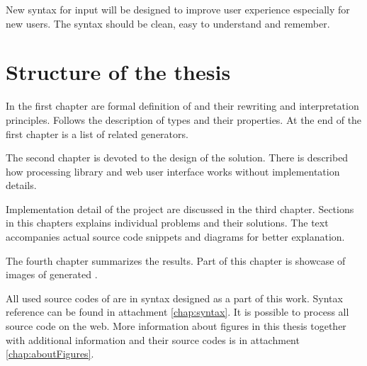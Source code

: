 New syntax for input will be designed to improve user experience especially for new users.
The syntax should be clean, easy to understand and remember.


\section*{Structure of the thesis}

In the first chapter are formal definition of \lsystems and their rewriting and interpretation principles.
Follows the description of \lsystem types and their properties.
At the end of the first chapter is a list of related \lsystem generators.

The second chapter is devoted to the design of the solution.
There is described how \lsystem processing library and web user interface works without implementation details.

Implementation detail of the project are discussed in the third chapter.
Sections in this chapters explains individual problems and their solutions.
The text accompanies actual source code snippets and diagrams for better explanation.

The fourth chapter summarizes the results.
Part of this chapter is showcase of images of generated \lsystems.

All used source codes of \lsystems are in syntax designed as a part of this work.
Syntax reference can be found in attachment \ref{chap:syntax}.
It is possible to process all source code on the web.
More information about figures in this thesis together with additional information and their source codes is in attachment \ref{chap:aboutFigures}.































